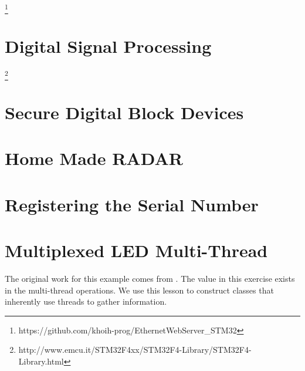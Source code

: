 \documentclass{article}
\begin{document}
\footnote{https://github.com/khoih-prog/EthernetWebServer\_STM32}




\section{Digital Signal Processing} %
\label{sec:digital_signal_processing}

\footnote{http://www.emcu.it/STM32F4xx/STM32F4-Library/STM32F4-Library.html}






\section{Secure Digital Block Devices} %
\label{sec:secure_digital_block_devices}




\section{Home Made RADAR} %
\label{sec:home_made_radar}




\section{Registering the Serial Number} %




\section{Multiplexed LED Multi-Thread} %
\label{sec:multiplexed_led_multi_thread}

The original work for this example comes from \cite{Ibrahim-ARM-based-Microcontrollers}.  The value in this exercise exists in the multi-thread operations.   We use this lesson to construct classes that inherently use threads to gather information.

\end{document}
